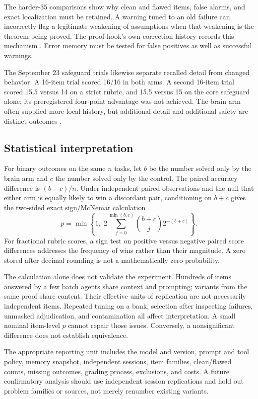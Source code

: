 The harder-35 comparisons show why clean and flawed items, false alarms, and exact localization must be retained. A warning tuned to an old failure can incorrectly flag a legitimate weakening of assumptions when that weakening is the theorem being proved. The proof hook's own correction history records this mechanism \citep{proofhooks}. Error memory must be tested for false positives as well as successful warnings.

The September 23 safeguard trials likewise separate recalled detail from changed behavior. A 16-item trial scored 16/16 in both arms. A second 16-item trial scored 15.5 versus 14 on a strict rubric, and 15.5 versus 15 on the core safeguard alone; its preregistered four-point advantage was not achieved. The brain arm often supplied more local history, but additional detail and additional safety are distinct outcomes \citep{benchmark_t2,benchmark_t3}.



\subsection{Statistical interpretation}

For binary outcomes on the same $n$ tasks, let $b$ be the number solved only by the brain arm and $c$ the number solved only by the control. The paired accuracy difference is $(b-c)/n$. Under independent paired observations and the null that either arm is equally likely to win a discordant pair, conditioning on $b+c$ gives the two-sided exact sign/McNemar calculation
\[
p=\min\left\{1,\;
2\sum_{j=0}^{\min(b,c)}
\binom{b+c}{j}2^{-(b+c)}
\right\}.
\]
For fractional rubric scores, a sign test on positive versus negative paired score differences addresses the frequency of wins rather than their magnitude. A zero stored after decimal rounding is not a mathematically zero probability.

The calculation alone does not validate the experiment. Hundreds of items answered by a few batch agents share context and prompting; variants from the same proof share content. Their effective units of replication are not necessarily independent items. Repeated tuning on a bank, selection after inspecting failures, unmasked adjudication, and contamination all affect interpretation. A small nominal item-level $p$ cannot repair those issues. Conversely, a nonsignificant difference does not establish equivalence.

The appropriate reporting unit includes the model and version, prompt and tool policy, memory snapshot, independent sessions, item families, clean/flawed counts, missing outcomes, grading process, exclusions, and costs. A future confirmatory analysis should use independent session replications and hold out problem families or sources, not merely renumber existing variants.


